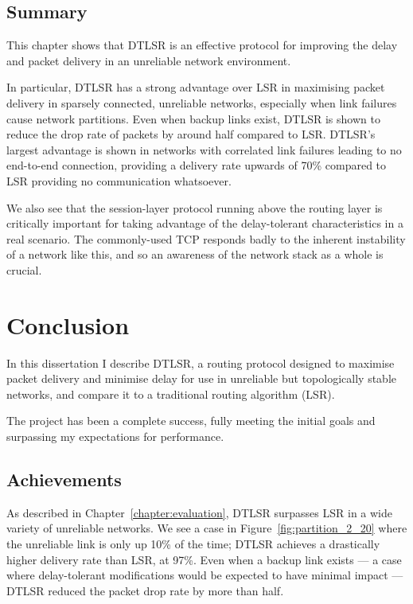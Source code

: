\documentclass[withindex,glossary,openany]{cam-thesis}
\begin{document}
\section{Summary}

This chapter shows that DTLSR is an effective protocol for improving the delay and packet delivery in an unreliable network environment.

In particular, DTLSR has a strong advantage over LSR in maximising packet delivery in sparsely connected, unreliable networks, especially when link failures cause network partitions. Even when backup links exist, DTLSR is shown to reduce the drop rate of packets by around half compared to LSR. DTLSR's largest advantage is shown in networks with correlated link failures leading to no end-to-end connection, providing a delivery rate upwards of 70\% compared to LSR providing no communication whatsoever.

We also see that the session-layer protocol running above the routing layer is critically important for taking advantage of the delay-tolerant characteristics in a real scenario. The commonly-used TCP responds badly to the inherent instability of a network like this, and so an awareness of the network stack as a whole is crucial.

\chapter{Conclusion}

In this dissertation I describe DTLSR, a routing protocol designed to maximise packet delivery and minimise delay for use in unreliable but topologically stable networks, and compare it to a traditional routing algorithm (LSR).

The project has been a complete success, fully meeting the initial goals and surpassing my expectations for performance.

\section{Achievements}

As described in Chapter~\ref{chapter:evaluation}, DTLSR surpasses LSR in a wide variety of unreliable networks. We see a case in Figure~\ref{fig:partition_2_20} where the unreliable link is only up 10\% of the time; DTLSR achieves a drastically higher delivery rate than LSR, at 97\%. Even when a backup link exists --- a case where delay-tolerant modifications would be expected to have minimal impact --- DTLSR reduced the packet drop rate by more than half.
\end{document}
